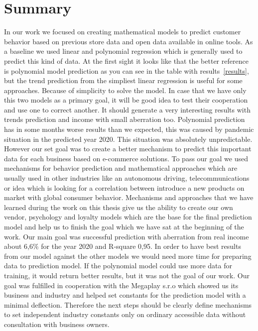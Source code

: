 
\chapter{Summary} \label{summary}
In our work we focused on creating mathematical models to predict customer behavior based on previous store data and open data available in online tools.
As a baseline we used linear and polynomial regression which is generally used to predict this kind of data.
At the first sight it looks like that the better reference is polynomial model prediction as you can see in the table with results~\ref{results},
but the trend prediction from the simpliest linear regression is useful for some approaches.
Because of simplicity to solve the model.
In case that we have only this two models as a primary goal, it will be good idea to test their cooperation and use one to correct another.
It should generate a very interesting results with trends prediction and income with small aberration too.
Polynomial prediction has in some months worse results than we expected, this was caused by pandemic situation in the predicted year 2020.
This situation was absolutely unpredictable.
However our set goal was to create a better mechanism to predict this important data for each business based on e-commerce solutions.
To pass our goal we used mechanisms for behavior prediction and mathematical approaches which are usually used in other industries like an autonomous driving,
telecommunications or idea which is looking for a correlation between introduce a new products on market with global consumer behavior.
Mechanisms and approaches that we have learned during the work on this thesis give us the ability to create our own vendor,
psychology and loyalty models which are the base for the final prediction model and help us to finish the goal which we have sat at the beginning of the work.
Our main goal was successful prediction with aberration from real income about 6,6\% for the year 2020 and R-square 0,95.
In order to have best results from our model against the other models we would need more time for preparing data to prediction model.
If the polynomial model could use more data for training, it would return better results, but it was not the goal of our work.
Our goal was fulfilled in cooperation with the Megaplay s.r.o which showed us its business and industry and helped set constants for the prediction model with a minimal deflection.
Therefore the next steps should be clearly define mechanisms to set independent industry constants only on ordinary accessible data without consultation with business owners.
